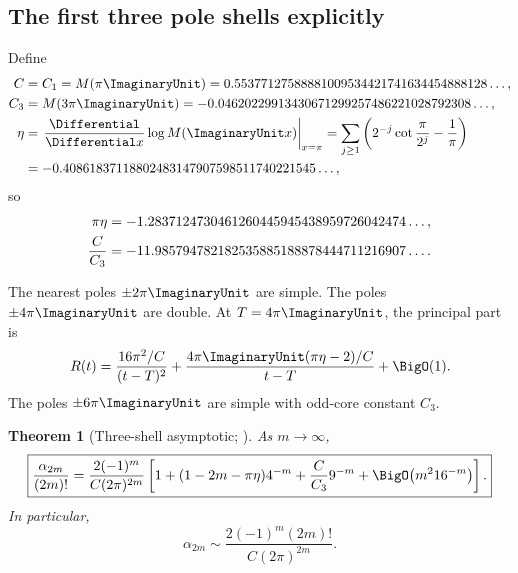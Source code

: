 \documentclass[11pt,oneside]{article}
\numberwithin{equation}{section}
\newtheorem{theorem}{Theorem}[section]
\theoremstyle{definition}
\theoremstyle{remark}
\begin{document}
\subsection{The first three pole shells explicitly}

Define
\begin{align}
 C&=C_1=M(\pi\ImaginaryUnit)
 =0.55377127588881009534421741634454888128\ldots,
 \label{p2:eq:C-value}\\
 C_3&=M(3\pi\ImaginaryUnit)
 =-0.04620229913430671299257486221028792308\ldots,
 \label{p2:eq:C3-value}\\
 \eta&=\left.\frac{\Differential}{\Differential x}\log M(\ImaginaryUnit x)\right|_{x=\pi}
 =\sum_{j\ge1}\left(2^{-j}\cot\frac{\pi}{2^j}-\frac1\pi\right)
 \notag\\
 &=-0.40861837118802483147907598511740221545\ldots,
 \label{p2:eq:eta-value}
\end{align}
so
\begin{align}
 \pi\eta
 &=-1.2837124730461260445945438959726042474\ldots,\notag\\
 \frac{C}{C_3}
 &=-11.985794782182535885188878444711216907\ldots.
 \label{p2:eq:eta-ratio-values}
\end{align}

The nearest poles $\pm2\pi\ImaginaryUnit$ are simple.  The poles $\pm4\pi\ImaginaryUnit$ are double.  At
$T=4\pi\ImaginaryUnit$, the principal part is
\begin{equation}
 R(t)=\frac{16\pi^2/C}{(t-T)^2}
 +\frac{4\pi\ImaginaryUnit(\pi\eta-2)/C}{t-T}+\BigO(1).
 \label{p2:eq:double-pole-principal}
\end{equation}
The poles $\pm6\pi\ImaginaryUnit$ are simple with odd-core constant $C_3$.

\begin{theorem}[Three-shell asymptotic; \statusnew]
\label{p2:thm:three-shell}
As $m\to\infty$,
\begin{equation}
 \boxed{
 \frac{\alpha_{2m}}{(2m)!}
 =\frac{2(-1)^m}{C(2\pi)^{2m}}
 \left[
 1+(1-2m-\pi\eta)4^{-m}
 +\frac{C}{C_3}9^{-m}
 +\BigO\!\left(m^2 16^{-m}\right)
 \right].
 }
 \label{p2:eq:alpha-three-shell}
\end{equation}
In particular,
\begin{equation}
 \alpha_{2m}
 \sim \frac{2(-1)^m(2m)!}{C(2\pi)^{2m}}.
 \label{p2:eq:alpha-leading-asymptotic}
\end{equation}
\end{theorem}
\end{document}
